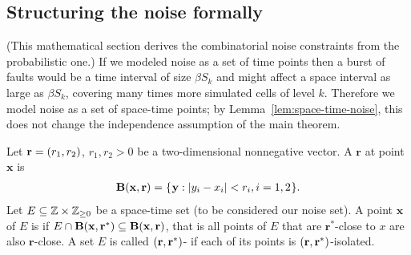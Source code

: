 \documentclass[11pt]{memoir}
\theoremstyle{definition} %
\renewcommand{\le}{\leq}
\renewcommand{\ge}{\geq}
\renewcommand{\vek}[1]{\mathbf{#1}}
\renewcommand{\S}{S} %
\renewcommand{\r}{\vek{r}} %
\newcommand{\x}{\vek{x}} %
\newcommand{\y}{\vek{y}} %
\begin{document}



\subsection{Structuring the noise formally}\label{sec:sparsity}

(This mathematical section derives the combinatorial noise
constraints from the probabilistic one.)
If we modeled noise as a set of time points then a burst of faults would be a time
interval of size \( \beta\S_{k} \) and might affect a space interval as large as \( \beta\S_{k} \),
covering many times more simulated cells of level \( k \).
Therefore we model noise as a set of space-time points; by Lemma~\ref{lem:space-time-noise},
this does not change the independence assumption of the main theorem.

\begin{definition}\label{def:isolation}
Let \( \r=\pair{r_{1}}{r_{2}} \), \( r_{1}, r_{2}> 0 \)
be a two-dimensional nonnegative vector.
A  \( \r  \)  at point  \( \x \) is
\begin{align}\label{eq:ball1}
  \bB(\x,\r) = \setOf{\y}{\abs{y_{i} - x_{i}} < r_{i}, i=1,2}.
\end{align}  
Let \( E\subseteq \bbZ\times\bbZ_{\ge 0} \) be a space-time set (to be considered our noise set).
A point \( \x \) of \( E \) is \df{\( \pair{\r}{\r^{*}} \)-isolated} if
\(  E \cap \bB(\x,\r^{*})\subseteq \bB(\x, \r)  \),
that is all points of \( E \) that are \( \r^{*} \)-close to \( x \) are also \( \r \)-close.
A set \( E \) is called \( \pair{\r}{\r^{*}} \)- if each of its points is \( \pair{\r}{\r^{*}} \)-isolated.
\end{definition}
\end{document}
